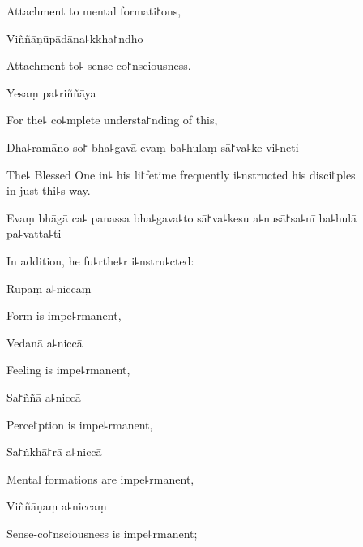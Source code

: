 \begin{english}
  Attachment to mental formati꜓ons,
\end{english}

Viññāṇūpādāna꜕kkha꜓ndho

\begin{english}
  Attachment to꜕ sense-co꜓nsciousness.
\end{english}

Yesaṃ pa꜕riññāya

\begin{english}
  For the꜕ co꜕mplete understa꜓nding of this,
\end{english}

Dha꜕ramāno so꜓ bha꜕gavā evaṃ ba꜕hulaṃ sā꜓va꜕ke vi꜕neti

\begin{english}
  The꜕ Blessed One in꜕ his li꜓fetime frequently i꜕nstructed his disci꜓ples \\in just thi꜕s way.
\end{english}

Evaṃ bhāgā ca꜕ panassa bha꜕gava꜕to sā꜓va꜕kesu a꜕nusā꜓sa꜕nī ba꜕hulā pa꜕vatta꜕ti

\begin{english}
  In addition, he fu꜕rthe꜕r i꜕nstru꜕cted:
\end{english}


Rūpaṃ a꜕niccaṃ

\begin{english}
  Form is impe꜕rmanent,
\end{english}

Vedanā a꜕niccā

\begin{english}
  Feeling is impe꜕rmanent,
\end{english}

Sa꜓ññā a꜕niccā

\begin{english}
  Perce꜓ption is impe꜕rmanent,
\end{english}

Sa꜓ṅkhā꜓rā a꜕niccā

\begin{english}
  Mental formations are impe꜕rmanent,
\end{english}

Viññāṇaṃ a꜕niccaṃ

\begin{english}
  Sense-co꜓nsciousness is impe꜕rmanent;
\end{english}

